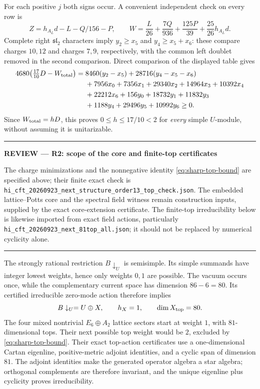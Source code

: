 \documentclass[11pt,a4paper]{article}
\theoremstyle{definition}
\newcommand{\artifact}[1]{\textnormal{\nolinkurl{#1}}}
\newenvironment{reviewnote}[1]{\par\addvspace{8pt}\begingroup
  \color{Sepia}\noindent\rule{\linewidth}{0.7pt}\par\nobreak
  \noindent\textbf{REVIEW --- #1}\par\nobreak\small\noindent\ignorespaces
}{\par\noindent\rule{\linewidth}{0.7pt}\par\endgroup\addvspace{8pt}}
\begin{document}
For each positive $j$ both signs occur. A convenient independent
check on every row is
\[
 Z=h_{A_L}d-L-Q/156-P,\qquad
 W=\frac L{26}+\frac{7Q}{936}+\frac{125P}{39}
                              +\frac{25}{26}h_{A_L}d.
\]
Complete right $\mathfrak{sl}_2$ characters imply
$y_2\ge x_5$ and $y_4\ge x_5+x_6$: these compare charges $10,12$
and charges $7,9$, respectively, with the common left doublet removed
in the second comparison. Direct comparison of the displayed table gives
\begin{align}
 4680\bigl(\tfrac{17}{10}D-W_{\rm total}\bigr)
 ={}&8460(y_2-x_5)+28716(y_4-x_5-x_6)\notag\\
 &+7956x_0+7356x_1+29340x_2+14964x_3+10392x_4\notag\\
 &+22212x_6+156y_0+18732y_1+11832y_3\notag\\
 &+1188y_4+29496y_5+10992y_6\ge0.
 \label{eq:sharp-top-bound}
\end{align}
Since $W_{\rm total}=hD$, this proves $0\le h\le17/10<2$ for
\emph{every} simple $U$-module, without assuming it is unitarizable.

\begin{reviewnote}{R2: scope of the core and finite-top certificates}
The charge minimizations and the nonnegative identity
\eqref{eq:sharp-top-bound} are specified above; their finite exact
check is
\artifact{hi_cft_20260923_next_structure_order13_top_check.json}.
The embedded lattice--Potts core and the spectral field witness remain
construction inputs, supplied by the exact core-extension certificate.
The finite-top irreducibility below is likewise imported from exact
field actions, particularly
\artifact{hi_cft_20260923_next_81top_all.json}; it should not be replaced
by numerical cyclicity alone.
\end{reviewnote}

The strongly rational restriction $B\downarrow_U$ is semisimple. Its
simple summands have integer lowest weights, hence only weights $0,1$
are possible. The vacuum occurs once, while the complementary current
space has dimension $86-6=80$. Its certified irreducible zero-mode
action therefore implies
\begin{equation}
 B\downarrow_U=U\oplus X,\qquad h_X=1,\qquad\dim X_{\rm top}=80.
 \label{eq:B-branching}
\end{equation}
The four mixed nontrivial $E_6\oplus A_2$ lattice sectors start at
weight $1$, with $81$-dimensional tops. Their next possible top weight
would be $2$, excluded by \eqref{eq:sharp-top-bound}. Their exact
top-action certificates use a one-dimensional Cartan eigenline,
positive-metric adjoint identities, and a cyclic span of dimension
$81$. The adjoint identities make the generated operator algebra a
star algebra; orthogonal complements are therefore invariant, and
the unique eigenline plus cyclicity proves irreducibility.
\end{document}

